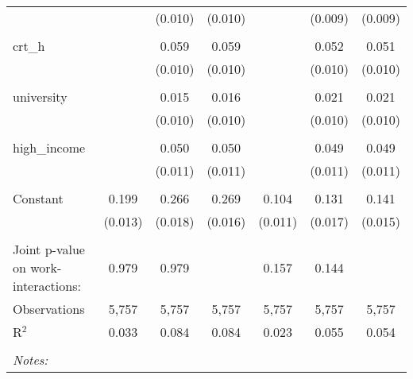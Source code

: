 \begin{table}[!htbp]
\begin{tabular}{@{\extracolsep{5pt}}lcccccc}
  &  & (0.010) & (0.010) &  & (0.009) & (0.009) \\ 
  & & & & & & \\ 
 crt\_h &  & 0.059 & 0.059 &  & 0.052 & 0.051 \\ 
  &  & (0.010) & (0.010) &  & (0.010) & (0.010) \\ 
  & & & & & & \\ 
 university &  & 0.015 & 0.016 &  & 0.021 & 0.021 \\ 
  &  & (0.010) & (0.010) &  & (0.010) & (0.010) \\ 
  & & & & & & \\ 
 high\_income &  & 0.050 & 0.050 &  & 0.049 & 0.049 \\ 
  &  & (0.011) & (0.011) &  & (0.011) & (0.011) \\ 
  & & & & & & \\ 
 Constant & 0.199 & 0.266 & 0.269 & 0.104 & 0.131 & 0.141 \\ 
  & (0.013) & (0.018) & (0.016) & (0.011) & (0.017) & (0.015) \\ 
  & & & & & & \\ 
Joint p-value on work-interactions: & 0.979 & 0.979 &  & 0.157 & 0.144 &  \\ 
Observations & 5,757 & 5,757 & 5,757 & 5,757 & 5,757 & 5,757 \\ 
R$^{2}$ & 0.033 & 0.084 & 0.084 & 0.023 & 0.055 & 0.054 \\ 
\hline \\[-1.8ex] 
\textit{Notes:} & \multicolumn{6}{l}{} \\ 
\end{tabular} 
\end{table}  
